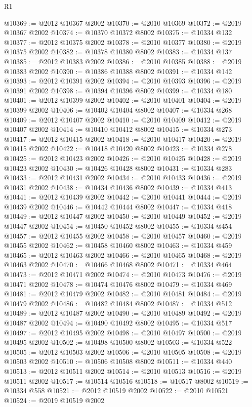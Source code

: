 \begin{lexlean}{R1}
\begin{coremodule}
@10369 := @2012 @10367 @2002
@10370 := @2010 @10369
@10372 := @2019 @10367 @2002
@10374 := @10370 @10372 @8002
@10375 := @10334 @132
@10377 := @2012 @10375 @2002
@10378 := @2010 @10377
@10380 := @2019 @10375 @2002
@10382 := @10378 @10380 @8002
@10383 := @10334 @137
@10385 := @2012 @10383 @2002
@10386 := @2010 @10385
@10388 := @2019 @10383 @2002
@10390 := @10386 @10388 @8002
@10391 := @10334 @142
@10393 := @2012 @10391 @2002
@10394 := @2010 @10393
@10396 := @2019 @10391 @2002
@10398 := @10394 @10396 @8002
@10399 := @10334 @180
@10401 := @2012 @10399 @2002
@10402 := @2010 @10401
@10404 := @2019 @10399 @2002
@10406 := @10402 @10404 @8002
@10407 := @10334 @268
@10409 := @2012 @10407 @2002
@10410 := @2010 @10409
@10412 := @2019 @10407 @2002
@10414 := @10410 @10412 @8002
@10415 := @10334 @273
@10417 := @2012 @10415 @2002
@10418 := @2010 @10417
@10420 := @2019 @10415 @2002
@10422 := @10418 @10420 @8002
@10423 := @10334 @278
@10425 := @2012 @10423 @2002
@10426 := @2010 @10425
@10428 := @2019 @10423 @2002
@10430 := @10426 @10428 @8002
@10431 := @10334 @283
@10433 := @2012 @10431 @2002
@10434 := @2010 @10433
@10436 := @2019 @10431 @2002
@10438 := @10434 @10436 @8002
@10439 := @10334 @413
@10441 := @2012 @10439 @2002
@10442 := @2010 @10441
@10444 := @2019 @10439 @2002
@10446 := @10442 @10444 @8002
@10447 := @10334 @418
@10449 := @2012 @10447 @2002
@10450 := @2010 @10449
@10452 := @2019 @10447 @2002
@10454 := @10450 @10452 @8002
@10455 := @10334 @454
@10457 := @2012 @10455 @2002
@10458 := @2010 @10457
@10460 := @2019 @10455 @2002
@10462 := @10458 @10460 @8002
@10463 := @10334 @459
@10465 := @2012 @10463 @2002
@10466 := @2010 @10465
@10468 := @2019 @10463 @2002
@10470 := @10466 @10468 @8002
@10471 := @10334 @464
@10473 := @2012 @10471 @2002
@10474 := @2010 @10473
@10476 := @2019 @10471 @2002
@10478 := @10474 @10476 @8002
@10479 := @10334 @469
@10481 := @2012 @10479 @2002
@10482 := @2010 @10481
@10484 := @2019 @10479 @2002
@10486 := @10482 @10484 @8002
@10487 := @10334 @512
@10489 := @2012 @10487 @2002
@10490 := @2010 @10489
@10492 := @2019 @10487 @2002
@10494 := @10490 @10492 @8002
@10495 := @10334 @517
@10497 := @2012 @10495 @2002
@10498 := @2010 @10497
@10500 := @2019 @10495 @2002
@10502 := @10498 @10500 @8002
@10503 := @10334 @522
@10505 := @2012 @10503 @2002
@10506 := @2010 @10505
@10508 := @2019 @10503 @2002
@10510 := @10506 @10508 @8002
@10511 := @10334 @440
@10513 := @2012 @10511 @2002
@10514 := @2010 @10513
@10516 := @2019 @10511 @2002
@10517 := @10514 @10516
@10518 := @10517 @8002
@10519 := @10334 @558
@10521 := @2012 @10519 @2002
@10522 := @2010 @10521
@10524 := @2019 @10519 @2002

\end{coremodule}
\end{lexlean}
